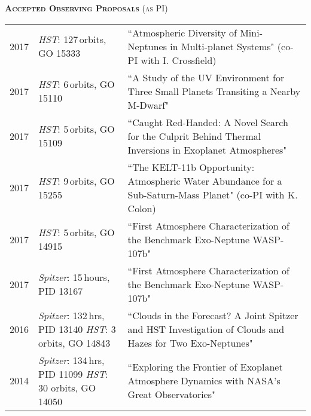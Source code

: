\documentclass[12pt,letterpaper]{article}
\begin{document}
\vspace{5mm}
\textbf{\textsc{Accepted Observing Proposals}} \textsc{(as PI)}
\vspace{1mm}

\begin{tabular}{ l p{5.0cm} p{10cm}}
  2017 &  \textit{HST}: 127\,orbits, GO 15333& ``Atmospheric Diversity of Mini-Neptunes in Multi-planet Systems" (co-PI with I. Crossfield)\\
  2017 &  \textit{HST}: 6\,orbits, GO 15110& ``A Study of the UV Environment for Three Small Planets Transiting a Nearby M-Dwarf" \\
  2017 &  \textit{HST}: 5\,orbits, GO 15109& ``Caught Red-Handed: A Novel Search for the Culprit Behind Thermal Inversions in Exoplanet Atmospheres" \\
  2017 &  \textit{HST}: 9\,orbits, GO 15255& ``The KELT-11b Opportunity: Atmospheric Water Abundance for a Sub-Saturn-Mass Planet" (co-PI with K. Colon)\\
 2017 & \textit{HST}: 5\,orbits, GO 14915 & ``First Atmosphere Characterization of the Benchmark Exo-Neptune WASP-107b"\\
 2017 & \textit{Spitzer}: 15\,hours, PID 13167& ``First Atmosphere Characterization of the Benchmark Exo-Neptune WASP-107b"\\
2016 & \textit{Spitzer}: 132\,hrs, PID 13140 \textit{HST}: 3 orbits, GO 14843 & ``Clouds in the Forecast? A Joint Spitzer and HST Investigation of Clouds and Hazes for Two Exo-Neptunes"\\
2014 & \textit{Spitzer}: 134\,hrs, PID 11099 \textit{HST}: 30 orbits, GO 14050& ``Exploring the Frontier of Exoplanet Atmosphere Dynamics with NASA's Great Observatories"
\end{tabular}
\end{document}
